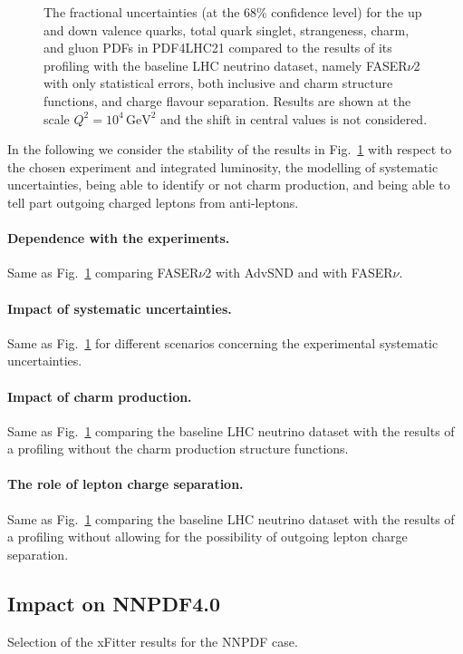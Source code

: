 \begin{figure}[t]
\caption{The fractional uncertainties (at the 68\% confidence level)
for the up and down valence quarks, total quark singlet, strangeness, charm, and gluon PDFs
in PDF4LHC21 compared to the results of its profiling with the baseline LHC neutrino dataset, namely
FASER$\nu$2 with only statistical errors, both inclusive and charm structure functions, and charge flavour
separation.
%
Results are shown at the scale $Q^2 = 10^4 \, \textrm{GeV}^2$ and the shift in central values
is not considered.}
\label{fig:profiling_baseline}
\end{figure}

In the following we consider the stability of the results in Fig.~\ref{fig:profiling_baseline}
with respect to the chosen experiment and integrated luminosity, the modelling of systematic
uncertainties, being able to identify or not charm production, and being able to tell part outgoing
charged leptons from anti-leptons.

\paragraph{Dependence with the experiments.}
%
Same as Fig.~\ref{fig:profiling_baseline} comparing FASER$\nu$2 with AdvSND and with FASER$\nu$.

\paragraph{Impact of systematic uncertainties.}
%
Same as Fig.~\ref{fig:profiling_baseline} for different scenarios concerning the experimental
systematic uncertainties.

\paragraph{Impact of charm production.}
%
Same as Fig.~\ref{fig:profiling_baseline} comparing the baseline LHC neutrino dataset with the results
of a profiling without the charm production structure functions.

\paragraph{The role of lepton charge separation.}
%
Same as Fig.~\ref{fig:profiling_baseline} comparing the baseline LHC neutrino dataset with the results
of a profiling without allowing for the possibility of outgoing lepton charge separation.



\subsection{Impact on NNPDF4.0}
\label{sec:nnpdf40}

Selection of the {\sc\small xFitter} results for the NNPDF case.
